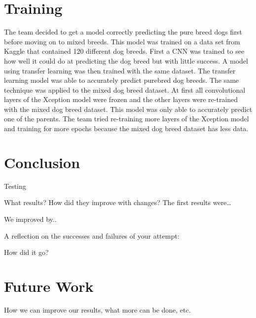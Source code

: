 \documentclass[12pt]{report}
\begin{document}
\section* {Training}
\indent \par
\par The team decided to get a model correctly predicting the pure breed dogs first before moving on to mixed breeds. This model was trained on a data set from Kaggle that contained 120 different dog breeds. First a CNN was trained to see how well it could do at predicting the dog breed but with little success. A model using transfer learning was then trained with the same dataset. The transfer learning model was able to accurately predict purebred dog breeds. The same technique was applied to the mixed dog breed dataset. At first all convolutional layers of the Xception model were frozen and the other layers were re-trained with the mixed dog breed dataset. This model was only able to accurately predict one of the parents. The team tried re-training more layers of the Xception model and training for more epochs because the mixed dog breed dataset has less data. 


	
	\begin{figure}[]
\centering 
\begin{subfigure}{.5\textwidth}
\centering

\label{}
\end{subfigure}%

\caption{\label{}}
\end{figure}

\section* {Conclusion}
\indent \indent \par Testing
\par What results? How did they improve with changes? The first results were…
\par We improved by..
\par A reflection on the successes and failures of your attempt:  
\par How did it go?
	

\section* {Future Work}

\par	How we can improve our results, what more can be done, etc. 
\end{document}
